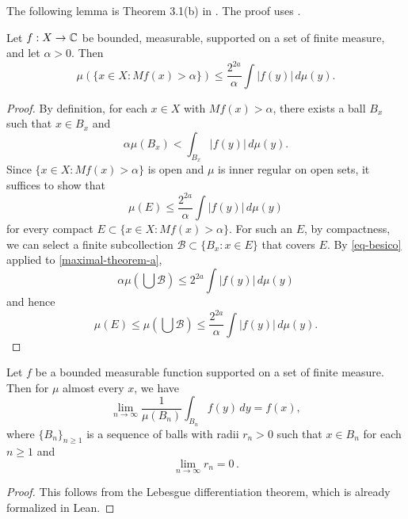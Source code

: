 The following lemma is Theorem 3.1(b) in \cite{stein-book}. The proof uses .
\begin{lemma} 
    \label{maximal-theorem}
    Let $f: X \to {\mathbb{C}}$ be bounded, measurable, supported on a set of finite measure, and let $\alpha > 0$. Then
    \begin{equation}
        \label{maximal-theorem-equation}
        \mu(\{x\in X : Mf(x) > \alpha\}) \le \frac{2^{2a}}{\alpha} \int |f(y)|\, d\mu(y).
    \end{equation}
\end{lemma}
\begin{proof}
    By definition, for each $x\in X$ with $Mf(x) > \alpha$, there exists a ball $B_x$ such that $x\in B_x$ and
    \begin{equation}
        \label{maximal-theorem-a}
        \alpha \mu(B_x) < \int_{B_x} |f(y)|\, d\mu(y).
    \end{equation}
    Since $\{x\in X : Mf(x) > \alpha\}$ is open and $\mu$ is inner regular on open sets, it suffices to show that
    \begin{equation*}
        \mu(E) \le \frac{2^{2a}}{\alpha} \int |f(y)|\, d\mu(y)
    \end{equation*}
    for every compact $E\subset \{x\in X : Mf(x) > \alpha\}$.
    For such an $E$, by compactness, we can select a finite subcollection $\mathcal{B} \subset \{B_x: x\in E\}$ that covers $E$.
    By \eqref{eq-besico} applied to \eqref{maximal-theorem-a},
    \begin{equation}
        \alpha \mu(\bigcup \mathcal{B}) \le 2^{2a} \int |f(y)|\,d\mu(y)
    \end{equation}
    and hence
    \begin{equation*}
        \mu(E) \le \mu(\bigcup \mathcal{B}) \le \frac{2^{2a}}{\alpha} \int |f(y)|\,d\mu(y).
    \end{equation*}
\end{proof}

\begin{lemma}
    \label{Lebesgue-differentiation}
    Let $f$ be a bounded measurable function supported on a set of finite measure. Then for $\mu$ almost every $x$, we have
    $$\lim_{n\to \infty} \frac{1}{\mu(B_n)}\int_{B_n} f(y)\, dy= f(x),$$
    where $\{B_n\}_{n\geq 1}$ is a sequence of balls with radii $r_n>0$ such that $x\in B_n$ for each $n\geq 1$ and
    \begin{equation*}
        \lim_{n\to \infty} r_n=0 \,.
    \end{equation*}
\end{lemma}
\begin{proof}
    This follows from the Lebesgue differentiation theorem, which is already formalized in Lean.
\end{proof}


